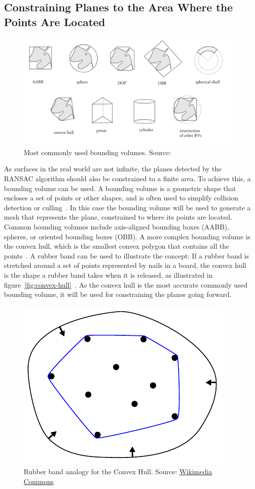 \subsection{Constraining Planes to the Area Where the Points Are Located}\label{subsec:constraining-planes-to-the-area-where-the-points-are-located}

\begin{figure}[ht!]
    \centering
    \includegraphics[width=0.9\linewidth]{images/bounding-volumes}
    \caption{Most commonly used bounding volumes. Source: \cite{gabriel_zachmann_geometric_2002}}
\end{figure}

As surfaces in the real world are not infinite, the planes detected by the RANSAC algorithm should also be constrained to a finite area.
To achieve this, a bounding volume can be used.
A bounding volume is a geometric shape that encloses a set of points or other shapes,
and is often used to simplify collision detection or culling~\cite{gabriel_zachmann_geometric_2002}.
In this case the bounding volume will be used to generate a mesh that represents the plane, constrained to where its points are located.
Common bounding volumes include axis-aligned bounding boxes (AABB), spheres, or oriented bounding boxes (OBB).
A more complex bounding volume is the convex hull, which is the smallest convex polygon that contains all the points~\cite{gabriel_zachmann_geometric_2002}.
A rubber band can be used to illustrate the concept: If a rubber band is stretched around a set of points represented by nails in a board,
the convex hull is the shape a rubber band takes when it is released, as illustrated in figure~\ref{fig:convex-hull}~\cite{de_berg_computational_2008}.
As the convex hull is the most accurate commonly used bounding volume,
it will be used for constraining the planes going forward.

\begin{figure}[ht!]
    \centering
    \includegraphics[width=0.25\linewidth]{images/ConvexHull}
    \caption{Rubber band analogy for the Convex Hull. Source: \href{https://commons.wikimedia.org/wiki/File:ConvexHull.svg}{Wikimedia Commons}}
\end{figure}

